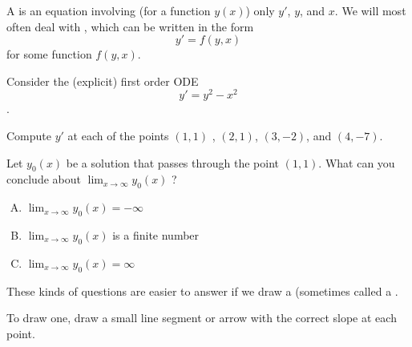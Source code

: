 \begin{applicationActivities}
\begin{definition}
A   is an equation involving (for a function \(y(x)\)) only  \(y'\), \(y\), and \(x\).
\vfill
We will most often deal with , which can be written in the form \[y' = f(y,x)\] for some function \(f(y,x)\).
\end{definition}


\begin{activity}{5}
Consider the (explicit) first order ODE \[y' = y^2-x^2\].

\vfill

\begin{subactivity}
Compute \(y'\) at each of the points \( (1,1)\) , \((2,1)\), \((3, -2)\), and \( (4, -7) \).
\end{subactivity}
\begin{subactivity}

\end{subactivity}
Let \(y_0(x)\) be a solution that passes through the point \( (1,1) \).  What can you conclude about \( \lim _{x \rightarrow \infty} y_0(x) \) ?
\begin{enumerate}[(A)]
\item \( \lim _{x \rightarrow \infty} y_0(x) = -\infty \) 
\item \( \lim _{x \rightarrow \infty} y_0(x) \) is a finite number
\item \( \lim _{x \rightarrow \infty} y_0(x) = \infty \) 
\end{enumerate}
\end{activity}

\begin{definition}
These kinds of questions are easier to answer if we draw a  (sometimes called a . 

To draw one, draw a small line segment or arrow with the correct slope at each point.

\begin{center}\end{center}



\end{definition}
\end{applicationActivities}
